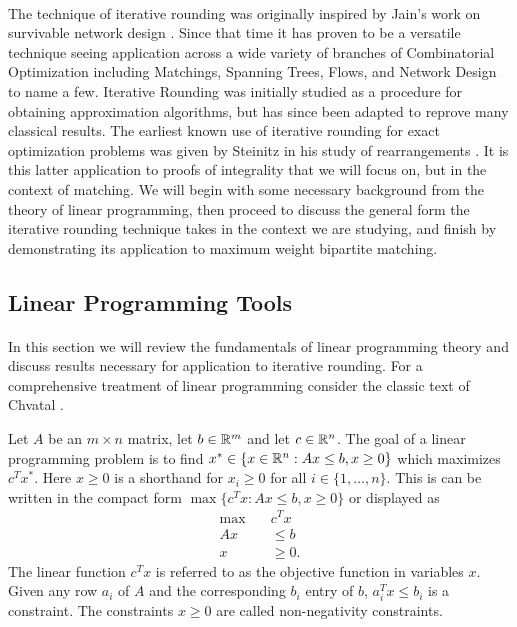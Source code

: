 \paragraph{}
The technique of iterative rounding was originally inspired by Jain's work on survivable network design \cite{jain2001factor}. Since that time it has proven to be a versatile technique seeing application across a wide variety of branches of Combinatorial Optimization including Matchings, Spanning Trees, Flows, and Network Design \cite{lau2011iterative} to name a few. Iterative Rounding was initially studied as a procedure for obtaining approximation algorithms, but has since been adapted to reprove many classical results. The earliest known use of iterative rounding for exact optimization problems was given by Steinitz in his study of rearrangements \cite{steinitz1913bedingt}. It is this latter application to proofs of integrality that we will focus on, but in the context of matching. We will begin with some necessary background from the theory of linear programming, then proceed to discuss the general form the iterative rounding technique takes in the context we are studying, and finish by demonstrating its application to maximum weight bipartite matching.
\subsection{Linear Programming Tools}\label{IR:LP}
\paragraph{}
In this section we will review the fundamentals of linear programming theory and discuss results necessary for application to iterative rounding. For a comprehensive treatment of linear programming consider the classic text of Chvatal \cite{chvatal1983linear}.
\begin{definition}
Let $A$ be an $m \times n$ matrix, let $b \in \mathbb{R}^m$ and let $c \in \mathbb{R}^n$. The goal of a linear programming problem is to find $x^* \in \{x \in \mathbb{R}^n : Ax \leq b, x \geq 0 \}$ which maximizes $c^Tx^*$. Here $x \geq 0$ is a shorthand for $x_i \geq 0$ for all $i \in \{1, \dots, n\}$. This is can be written in the compact form $\max\{c^Tx : Ax \leq b, x \geq 0 \}$ or displayed as
\begin{align}
\max\quad &c^Tx\nonumber \\
Ax &\leq b \label{LP:standard}\\
x &\geq 0.\nonumber
\end{align}
The linear function $c^Tx$ is referred to as the objective function in variables $x$. Given any row $a_i$ of $A$ and the corresponding $b_i$ entry of $b$, $a_i^Tx \leq b_i$ is a constraint. The constraints $x \geq 0$ are called non-negativity constraints. 
\end{definition}
